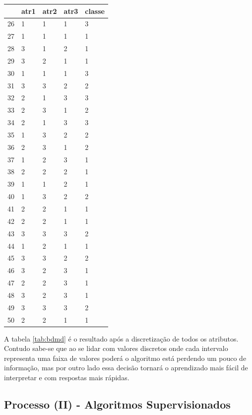 \begin{table}[!ht]
\begin{tabular}{ |lllll| }
\hline
  & atr1 & atr2 & atr3 & classe \\ \hline
26	&	1	&	1	&	1	&	3	\\	\hline
27	&	1	&	1	&	1	&	1	\\	\hline
28	&	3	&	1	&	2	&	1	\\	\hline
29	&	3	&	2	&	1	&	1	\\	\hline
30	&	1	&	1	&	1	&	3	\\	\hline
31	&	3	&	3	&	2	&	2	\\	\hline
32	&	2	&	1	&	3	&	3	\\	\hline
33	&	2	&	3	&	1	&	2	\\	\hline
34	&	2	&	1	&	3	&	3	\\	\hline
35	&	1	&	3	&	2	&	2	\\	\hline
36	&	2	&	3	&	1	&	2	\\	\hline
37	&	1	&	2	&	3	&	1	\\	\hline
38	&	2	&	2	&	2	&	1	\\	\hline
39	&	1	&	1	&	2	&	1	\\	\hline
40	&	1	&	3	&	2	&	2	\\	\hline
41	&	2	&	2	&	1	&	1	\\	\hline
42	&	2	&	2	&	1	&	1	\\	\hline
43	&	3	&	3	&	3	&	2	\\	\hline
44	&	1	&	2	&	1	&	1	\\	\hline
45	&	3	&	3	&	2	&	2	\\	\hline
46	&	3	&	2	&	3	&	1	\\	\hline
47	&	2	&	2	&	3	&	1	\\	\hline
48	&	3	&	2	&	3	&	1	\\	\hline
49	&	3	&	3	&	3	&	2	\\	\hline
50	&	2	&	2	&	1	&	1	\\	\hline

\end{tabular}
\end{table}

A tabela \ref{tab:bdmd} é o resultado após a discretização de todos os atributos. Contudo sabe-se que ao se lidar com valores discretos onde cada intervalo representa uma faixa de valores poderá o algoritmo está perdendo um pouco de informação, mas por outro lado essa decisão tornará o aprendizado mais fácil de interpretar e com respostas mais rápidas.

\subsection{Processo (II) - Algoritmos Supervisionados}\label{cap:ferramentas:ssec:algsuper}

